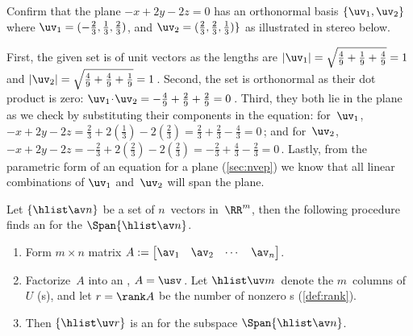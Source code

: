 \begin{example} \label{eg:orthbas2}
Confirm that the plane \(-x+2y-2z=0\) has an orthonormal basis \(\{\uv_1,\uv_2\}\) where \(\uv_1=(-\frac23,\frac13,\frac23)\), and \(\uv_2=(\frac23,\frac23,\frac13)\}\) as illustrated in stereo below.
\begin{center}
 {}
\end{center}
\begin{solution} 
First, the given set is of unit vectors as the lengths are \(|\uv_1|=\sqrt{\frac49+\frac19+\frac49}=1\) and \(|\uv_2|=\sqrt{\frac49+\frac49+\frac19}=1\)\,.
Second, the set is orthonormal as their dot product is zero: \(\uv_1\cdot\uv_2=-\frac49+\frac29+\frac29=0\)\,.
Third, they both lie in the plane as we check by substituting their components in the equation: for~\(\uv_1\), \(-x+2y-2z=\frac23+2(\frac13)-2(\frac23)=\frac23+\frac23-\frac43=0\)\,; and for~\(\uv_2\), \(-x+2y-2z=-\frac23+2(\frac23)-2(\frac23)=-\frac23+\frac43-\frac23=0\)\,.
Lastly, from the parametric form of an equation for a plane (\cref{sec:nvep}) we know that all linear combinations of \(\uv_1\) and~\(\uv_2\) will span the plane.
\end{solution}
\end{example}





\begin{procedure}\label{pro:ospan}
	Let $\{\hlist\av n\}$ be a set of $n$~vectors in~\(\RR^m\), then the following procedure finds an  for the  \(\Span\{\hlist\av n\}\). 
\begin{enumerate}
\item Form \(m\times n\) matrix $A:= \begin{bmatrix} \av_1 & \av_2& \cdots&\av_n \end{bmatrix}$. 
\item Factorize~\(A\) into an \svd, $A=\usv$\,. 
Let \(\hlist\uv m\)~denote the \(m\)~columns of~$U$ (s), and let \(r=\rank A\) be the number of nonzero s (\cref{def:rank}).  
\item Then \(\{\hlist\uv r\}\) is an  for the subspace \(\Span\{\hlist\av n\}\).
\end{enumerate}
\end{procedure}

